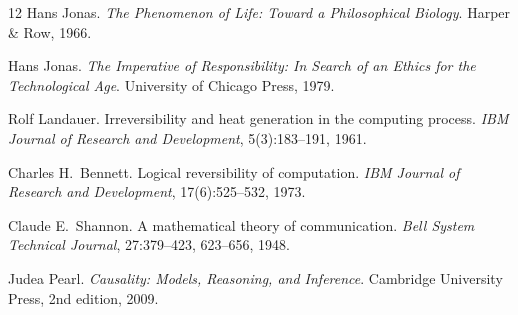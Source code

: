 \documentclass[12pt]{article}
\theoremstyle{plain}
\theoremstyle{definition}
\theoremstyle{remark}
\begin{document}
\begin{thebibliography}{12}
Hans Jonas.
\textit{The Phenomenon of Life: Toward a Philosophical Biology}.
Harper \& Row, 1966.

Hans Jonas.
\textit{The Imperative of Responsibility: In Search of an Ethics for the
Technological Age}.
University of Chicago Press, 1979.

Rolf Landauer.
Irreversibility and heat generation in the computing process.
\textit{IBM Journal of Research and Development}, 5(3):183--191, 1961.

Charles H.\ Bennett.
Logical reversibility of computation.
\textit{IBM Journal of Research and Development}, 17(6):525--532, 1973.

Claude E.\ Shannon.
A mathematical theory of communication.
\textit{Bell System Technical Journal}, 27:379--423, 623--656, 1948.

Judea Pearl.
\textit{Causality: Models, Reasoning, and Inference}.
Cambridge University Press, 2nd edition, 2009.

\end{thebibliography}
\end{document}
